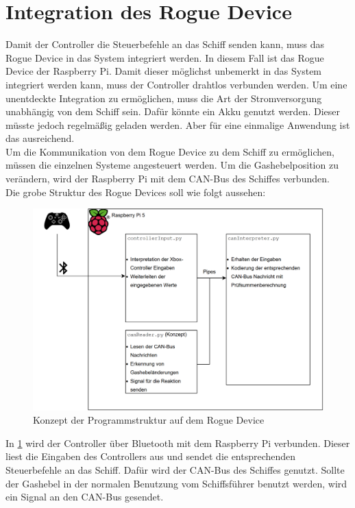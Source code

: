 \section{Integration des Rogue Device}
Damit der Controller die Steuerbefehle an das Schiff senden kann, muss das Rogue Device in das System integriert werden.
In diesem Fall ist das Rogue Device der Raspberry Pi. Damit dieser möglichst unbemerkt in das System integriert werden kann,
muss der Controller drahtlos verbunden werden. Um eine unentdeckte Integration zu ermöglichen, muss die Art der Stromversorgung
unabhängig von dem Schiff sein. Dafür könnte ein Akku genutzt werden. Dieser müsste jedoch regelmäßig geladen werden.
Aber für eine einmalige Anwendung ist das ausreichend. \\
Um die Kommunikation von dem Rogue Device zu dem Schiff zu ermöglichen, müssen
die einzelnen Systeme angesteuert werden. Um die Gashebelposition zu verändern, wird der Raspberry Pi mit dem CAN-Bus des Schiffes
verbunden. \\
Die grobe Struktur des Rogue Devices soll wie folgt aussehen:
\begin{figure}[H]
    \centering
    \includegraphics[scale=0.4]{images/piKonzept.png}
    \caption{Konzept der Programmstruktur auf dem Rogue Device}
    \label{fig:structureRogueDevice}
\end{figure}
In \ref{fig:structureRogueDevice} wird der Controller über Bluetooth mit dem Raspberry Pi verbunden. Dieser liest die Eingaben des Controllers aus und
sendet die entsprechenden Steuerbefehle an das Schiff. Dafür wird der CAN-Bus des Schiffes genutzt. 
Sollte der Gashebel in der normalen Benutzung vom Schiffsführer benutzt werden, wird ein Signal an den CAN-Bus gesendet. 
